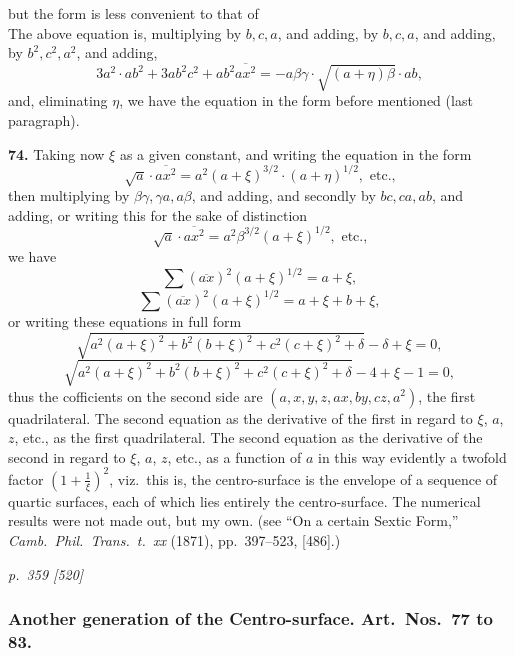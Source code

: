 \documentclass[11pt,a4paper]{book}
\begin{document}
but the form is less convenient to that of \\
The above equation is, multiplying by $b, c, a$, and adding, by $b, c, a$, and adding, by $b^2, c^2, a^2$, and adding,
\[
3a^2 \cdot ab^2 + 3a b^2 c^2 + a b^2 \overline{a x^2} = - a \beta \gamma \cdot \sqrt{(a + \eta) \beta} \cdot ab,
\]
and, eliminating $\eta$, we have the equation in the form before mentioned (last paragraph).

\textbf{74.} Taking now $\xi$ as a given constant, and writing the equation in the form
\[
\sqrt{a} \cdot \overline{a x^2} = a^2 (a + \xi)^{3/2} \cdot (a + \eta)^{1/2}, \text{ etc.,}
\]
then multiplying by $\beta \gamma, \gamma a, a \beta$, and adding, and secondly by $b c, c a, a b$, and adding, or writing this for the sake of distinction
\[
\sqrt{a} \cdot \overline{a x^2} = a^2 \beta^{3/2} (a + \xi)^{1/2}, \text{ etc.,}
\]
we have
\[
\sum (\overline{a x})^2 (a + \xi)^{1/2} = a + \xi,
\]
\[
\sum (\overline{a x})^2 (a + \xi)^{1/2} = a + \xi + b + \xi,
\]
or writing these equations in full form
\[
\sqrt{a^2 (a + \xi)^2 + b^2 (b + \xi)^2 + c^2 (c + \xi)^2 + \delta} - \delta + \xi = 0,
\]
\[
\sqrt{a^2 (a + \xi)^2 + b^2 (b + \xi)^2 + c^2 (c + \xi)^2 + \delta} - 4 + \xi - 1 = 0,
\]
thus the cofficients on the second side are $(a, x, y, z, ax, by, cz, a^2)$, the first quadrilateral. The second equation as the derivative of the first in regard to $\xi$, $a$, $z$, etc., as the first quadrilateral. The second equation as the derivative of the second in regard to $\xi$, $a$, $z$, etc., as a function of $a$ in this way evidently a twofold factor $\left(1 + \frac{1}{\xi}\right)^2$, viz.\ this is, the centro-surface is the envelope of a sequence of quartic surfaces, each of which lies entirely the centro-surface. The numerical results were not made out, but my own. (see ``On a certain Sextic Form,'' \textit{Camb.\ Phil.\ Trans.\ t.\ xx} (1871), pp.\ 397--523, [486].)

\clearpage

\bigskip
\textit{p.~359 [520]}
\smallskip

\subsubsection*{Another generation of the Centro-surface. Art.\ Nos.\ 77 to 83.}
\end{document}
